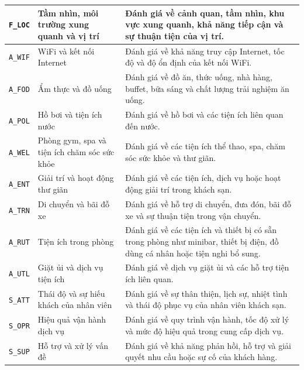 {\begin{longtable}{@{}
    >{\centering\arraybackslash}p{1.5cm}
    >{\RaggedRight\arraybackslash}p{4.0cm}
    >{\RaggedRight\arraybackslash}p{10cm}
@{}}
\texttt{F\_LOC}
&
Tầm nhìn, môi trường xung quanh và vị trí
&
Đánh giá về cảnh quan, tầm nhìn, khu vực xung quanh, khả năng tiếp cận và sự thuận tiện của vị trí. \\

\midrule

\texttt{A\_WIF}
&
WiFi và kết nối Internet
&
Đánh giá về khả năng truy cập Internet, tốc độ và độ ổn định của kết nối WiFi. \\

\texttt{A\_FOD}
&
Ẩm thực và đồ uống
&
Đánh giá về đồ ăn, thức uống, nhà hàng, buffet, bữa sáng và chất lượng trải nghiệm ăn uống. \\

\texttt{A\_POL}
&
Hồ bơi và tiện ích nước
&
Đánh giá về hồ bơi và các tiện ích liên quan đến nước. \\

\texttt{A\_WEL}
&
Phòng gym, spa và tiện ích chăm sóc sức khỏe
&
Đánh giá về các tiện ích thể thao, spa, chăm sóc sức khỏe và thư giãn. \\

\texttt{A\_ENT}
&
Giải trí và hoạt động thư giãn
&
Đánh giá về các tiện ích, dịch vụ hoặc hoạt động giải trí trong khách sạn. \\

\texttt{A\_TRN}
&
Di chuyển và bãi đỗ xe
&
Đánh giá về hỗ trợ di chuyển, đưa đón, bãi đỗ xe và sự thuận tiện trong vận chuyển. \\

\texttt{A\_RUT}
&
Tiện ích trong phòng
&
Đánh giá về các tiện ích và thiết bị có sẵn trong phòng như minibar, thiết bị điện, đồ dùng cá nhân hoặc tiện nghi bổ sung. \\

\texttt{A\_UTL}
&
Giặt ủi và dịch vụ tiện ích
&
Đánh giá về dịch vụ giặt ủi và các hỗ trợ tiện ích liên quan. \\

\midrule

\texttt{S\_ATT}
&
Thái độ và sự hiếu khách của nhân viên
&
Đánh giá về sự thân thiện, lịch sự, nhiệt tình và thái độ phục vụ của nhân viên khách sạn. \\

\texttt{S\_OPR}
&
Hiệu quả vận hành dịch vụ
&
Đánh giá về quy trình vận hành, tốc độ xử lý và mức độ hiệu quả trong cung cấp dịch vụ. \\

\texttt{S\_SUP}
&
Hỗ trợ và xử lý vấn đề
&
Đánh giá về khả năng phản hồi, hỗ trợ và giải quyết nhu cầu hoặc sự cố của khách hàng. \\


\end{longtable}}
